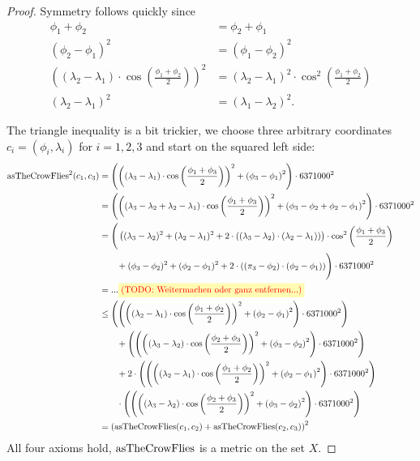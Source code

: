 \begin{proof}
		Symmetry follows quickly since
		\begin{align*}
			\phi_1 + \phi_2	&= \phi_2 + \phi_1\\
			(\phi_2 - \phi_1)^2	&= (\phi_1 - \phi_2)^2\\
			\left((\lambda_2 - \lambda_1) \cdot \cos\left(\frac{\phi_1 + \phi_2}{2}\right)\right)^2
				&= (\lambda_2 - \lambda_1)^2 \cdot \cos^2\left(\frac{\phi_1 + \phi_2}{2}\right)\\
			(\lambda_2 - \lambda_1)^2	&= (\lambda_1 - \lambda_2)^2.
		\end{align*}
		
		The triangle inequality is a bit trickier, we choose three arbitrary coordinates $c_i = (\phi_i, \lambda_i)$ for $i = 1, 2, 3$
		and start on the squared left side:
		\begin{align*}
			\asTheCrowFlies^2(c_1, c_3)
				&= \left(\left(\left(\lambda_3 - \lambda_1\right) \cdot \cos\left(\frac{\phi_1 + \phi_3}{2}\right)\right)^2
					+ \left(\phi_3 - \phi_1\right)^2\right) \cdot 6371000^2\\
				&= \left(\left(\left(\lambda_3 - \lambda_2 + \lambda_2 - \lambda_1\right) \cdot \cos\left(\frac{\phi_1 + \phi_3}{2}\right)\right)^2
					+ \left(\phi_3 - \phi_2 + \phi_2 - \phi_1\right)^2\right) \cdot 6371000^2\\
				&= \Bigg(\left((\lambda_3 - \lambda_2)^2 + (\lambda_2 - \lambda_1)^2 + 2 \cdot ((\lambda_3 - \lambda_2) \cdot (\lambda_2 - \lambda_1))\right)
						\cdot \cos^2\left(\frac{\phi_1 + \phi_3}{2}\right)\\
					&\qquad + (\phi_3 - \phi_2)^2 + (\phi_2 - \phi_1)^2 + 2 \cdot ((\pi_3 - \phi_2) \cdot (\phi_2 - \phi_1))\Bigg) \cdot 6371000^2\\
				&= ...\todo{\text{Weitermachen oder ganz entfernen...}}\\
				&\le \left(\left(\left(\left(\lambda_2 - \lambda_1\right) \cdot \cos\left(\frac{\phi_1 + \phi_2}{2}\right)\right)^2
						+ \left(\phi_2 - \phi_1\right)^2\right) \cdot 6371000^2\right)\\
					&\qquad+ \left(\left(\left(\left(\lambda_3 - \lambda_2\right) \cdot \cos\left(\frac{\phi_2 + \phi_3}{2}\right)\right)^2
						+ \left(\phi_3 - \phi_2\right)^2\right) \cdot 6371000^2\right)\\
					&\qquad + 2 \cdot \left(\left(\left(\left(\lambda_2 - \lambda_1\right) \cdot \cos\left(\frac{\phi_1 + \phi_2}{2}\right)\right)^2
						+ \left(\phi_2 - \phi_1\right)^2\right) \cdot 6371000^2\right)\\
					&\qquad \cdot \left(\left(\left(\left(\lambda_3 - \lambda_2\right) \cdot \cos\left(\frac{\phi_2 + \phi_3}{2}\right)\right)^2
						+ \left(\phi_3 - \phi_2\right)^2\right) \cdot 6371000^2\right)\\
				&= \left(\asTheCrowFlies(c_1, c_2) + \asTheCrowFlies(c_2, c_3)\right)^2
		\end{align*}
		All four axioms hold, $\operatorname{asTheCrowFlies}$ is a metric on the set $X$.
	\end{proof}